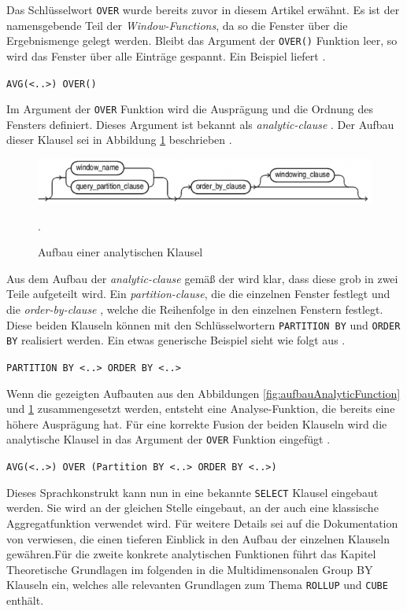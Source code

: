 Das Schlüsselwort \texttt{OVER} wurde bereits zuvor in diesem Artikel erwähnt. Es
ist der namensgebende Teil der \textit{Window-Functions}, da so die Fenster über
die Ergebnismenge gelegt werden. Bleibt das Argument der \texttt{OVER()} Funktion
leer, so wird das Fenster über alle Einträge gespannt. Ein Beispiel liefert \citet[S.
36]{Nuijten2023}.
\begin{center}
	\texttt{AVG(<..>) OVER()}
\end{center}
Im Argument der \texttt{OVER} Funktion wird die Ausprägung und die Ordnung des
Fensters definiert. Dieses Argument ist bekannt als \textit{analytic-clause}
\citep[vgl.][]{oracle}. Der Aufbau dieser Klausel sei in Abbildung
\ref{fig:aufbauAnalytischeKlausel} beschrieben \citep[vgl.][K. 7]{oracle}.
\begin{figure}[h]
	\centering
	\includegraphics[scale=0.5]{img/aufbauAnalyticClausel.jpg}
	\caption{ Aufbau einer analytischen Klausel \citep[vgl.][K. 7]{oracle}}
	. \label{fig:aufbauAnalytischeKlausel}
\end{figure}
Aus dem Aufbau der \textit{analytic-clause} gemäß der \citet[K.~7]{oracle} wird
klar, dass diese grob in zwei Teile aufgeteilt wird. Ein \textit{partition-clause},
die die einzelnen Fenster festlegt und die \textit{order-by-clause} , welche die
Reihenfolge in den einzelnen Fenstern festlegt. Diese beiden Klauseln können mit
den Schlüsselwortern \texttt{PARTITION BY} und \texttt{ORDER BY} realisiert
werden. Ein etwas generische Beispiel sieht wie folgt aus \citep[vgl.][K.7]{oracle}.
\begin{center}
	\texttt{PARTITION BY <..> ORDER BY <..>}
\end{center}
Wenn die gezeigten Aufbauten aus den Abbildungen \ref{fig:aufbauAnalyticFunction}
und \ref{fig:aufbauAnalytischeKlausel} zusammengesetzt werden, entsteht eine
Analyse-Funktion, die bereits eine höhere Ausprägung hat. Für eine korrekte
Fusion der beiden Klauseln wird die analytische Klausel in das Argument der
\texttt{OVER} Funktion eingefügt \citep[vgl.][S. 36]{Nuijten2023}.
\begin{center}
	\texttt{AVG(<..>) OVER (Partition BY <..> ORDER BY <..>)}
\end{center}
Dieses Sprachkonstrukt kann nun in eine bekannte \texttt{SELECT} Klausel
eingebaut werden. Sie wird an der gleichen Stelle eingebaut, an der auch eine
klassische Aggregatfunktion verwendet wird. Für weitere Details sei auf die Dokumentation
von \citet[K.~7]{oracle} verwiesen, die einen tieferen Einblick in den Aufbau der
einzelnen Klauseln gewähren.Für die zweite konkrete analytischen Funktionen führt
das Kapitel Theoretische Grundlagen im folgenden in die Multidimensonalen Group BY
Klauseln ein, welches alle relevanten Grundlagen zum Thema \texttt{ROLLUP} und \texttt{CUBE}
enthält.

